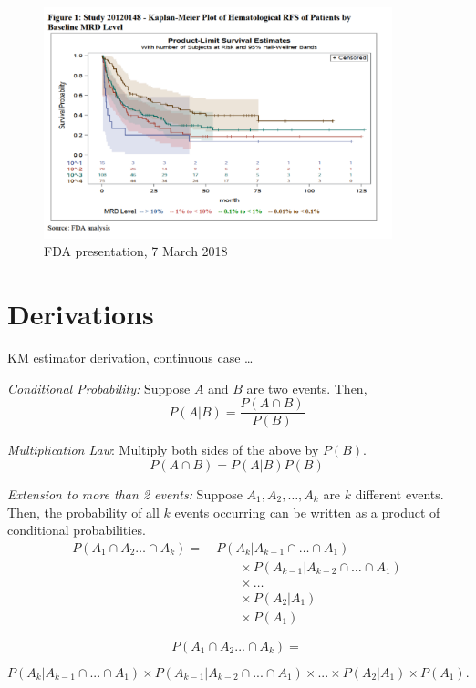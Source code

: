\documentclass[ignorenonframetext,]{beamer}
\begin{document}
\begin{frame}

\begin{figure}
\centering
\includegraphics[width=0.9\textwidth,height=\textheight]{../figures/usfda_mrd_leukemia_km.pdf}
\caption{FDA presentation, 7 March 2018}
\end{figure}

\end{frame}

\hypertarget{derivations}{%
\section{Derivations}\label{derivations}}

\begin{frame}{%
\protect\hypertarget{km-estimator-derivation-continuous-case}{%
KM estimator derivation, continuous case \ldots}}

\emph{Conditional Probability:} Suppose \(A\) and \(B\) are two events.
Then, \[  P(A|B)  =    \frac { P(A \cap B)}  { P(B)}\]

\emph{Multiplication Law}: Multiply both sides of the above by \(P(B)\).
\[P(A \cap B) =  P(A|B) P(B) \]

\emph{Extension to more than 2 events:} Suppose
\(A_1, A_2, \ldots, A_k\) are \(k\) different events. Then, the
probability of all \(k\) events occurring can be written as a product of
conditional probabilities. \begin{align*}
P(A_1 \cap A_2 \ldots \cap A_k) =& \ P(A_k|A_{k-1} \cap \ldots \cap A_1) \\
& \qquad \times P(A_{k-1}|A_{k-2} \cap \ldots \cap A_1) \\
& \qquad \times \ldots \\
& \qquad \times P(A_2 | A_1) \\
& \qquad \times P(A_1)
\end{align*}

\[
   P(A_1 \cap A_2 ... \cap A_k)   = \]

\[ P(A_k|A_{k-1} \cap ... \cap A_1)
         \times  P(A_{k-1}|A_{k-2} \cap  ... \cap A_1) \times
              ...     \times P(A_2| A_1) \times P(A_1) .\]

\end{frame}
\end{document}
